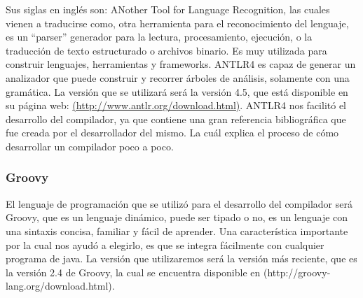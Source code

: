 \documentclass[%
 aip,
 jmp,%
 amsmath,amssymb,
 reprint,%
]{revtex4-1}
\begin{document}
Sus siglas en inglés son: ANother Tool for Language Recognition, las cuales vienen a traducirse como, otra herramienta para el reconocimiento del lenguaje, es un “parser” generador para la lectura, procesamiento, ejecución, o la traducción de texto estructurado o archivos binario. Es muy utilizada para construir lenguajes, herramientas y frameworks. 
ANTLR4 es capaz  de generar un analizador que puede construir y recorrer árboles de análisis, solamente con una gramática. La versión que se utilizará será la versión 4.5, que está disponible en su página web: \url{(http://www.antlr.org/download.html)}. 
ANTLR4 nos facilitó el desarrollo del compilador, ya que contiene una gran referencia bibliográfica que fue creada por el desarrollador del mismo. La cuál explica el proceso de cómo desarrollar un compilador poco a poco.

\subsubsection{\label{sec:level3}Groovy}

El lenguaje de programación que se utilizó para el desarrollo del compilador será Groovy, que es un lenguaje dinámico, puede ser tipado o no,  es un lenguaje con una sintaxis concisa, familiar y fácil de aprender. Una característica importante por la cual nos ayudó a elegirlo, es que se integra fácilmente con cualquier programa de java. La versión que utilizaremos será la versión más reciente, que es la versión 2.4 de Groovy, la cual se encuentra disponible en \url{}(http://groovy-lang.org/download.html).
\end{document}

